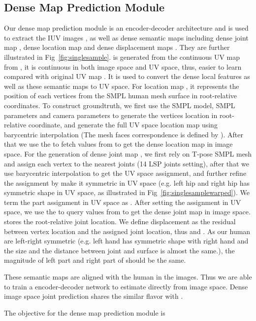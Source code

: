 \documentclass[10pt,twocolumn,letterpaper]{article}
\begin{document}
\subsection{Dense Map Prediction Module}

Our dense map prediction module is an encoder-decoder architecture and is used to extract the IUV images , as well as dense semantic maps including dense joint map , dense location map  and dense displacement maps . They are further illustrated in Fig~\ref{fig:singlesample}.   is generated from the continuous UV map from \cite{decomr}, it is continuous in both image space and UV space, thus, easier to learn compared with original UV map \cite{smpl}. It is used to convert the dense local features as well as these semantic maps to UV space. For location map , it represents the position of each vertices from the SMPL human mesh surface in root-relative coordinates. To construct  groundtruth, we first use the SMPL model, SMPL parameters and camera parameters to generate the vertices location in root-relative coordinate, and generate the full UV space location map  using barycentric interpolation (The mesh faces correspondence is defined by \cite{decomr}). After that we use the  to fetch values from  to get the dense location map in image space.  For the generation of dense joint map , we first rely on T-pose SMPL mesh and assign each vertex to the nearest joints (14 LSP joints setting), after that we use barycentric interpolation to get the UV space assignment, and further refine the assignment by make it symmetric in UV space (e.g. left hip and right hip has symmetric shape in UV space, as illustrated in Fig~\ref{fig:singlesamplewarped}). We term the part assignment in UV space  as  . After setting the assignment in UV space, we use the  to query values from  to get the dense joint map in image space.  stores the root-relative joint location. We define displacement as the residual between vertex location and the assigned joint location, thus   and . As our human are left-right symmetric (e.g. left hand has symmetric shape with right hand and the size and the distance between joint and surface is almost the same.), the magnitude of left part and right part of  should be the same. 

These semantic maps are aligned with the human in the images. Thus we are able to train a encoder-decoder network to estimate directly from image space. Dense image space joint prediction shares the similar flavor with \cite{A2J,personlab}. 

The objective for the dense map prediction module is 
\end{document}
